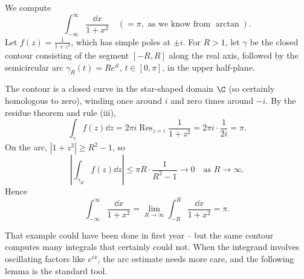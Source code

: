 \begin{example}
    We compute
    $$
    \int_{-\infty}^{\infty} \frac{\dd x}{1 + x^2} \quad (= \pi, \text{ as we know from } \arctan).
    $$
    Let $f(z) = \frac{1}{1 + z^2}$, which has simple poles at $\pm i$. For $R > 1$, let $\gamma$ be the closed contour consisting of the segment $[-R, R]$ along the real axis, followed by the semicircular arc $\gamma_R(t) = Re^{it}$, $t \in [0, \pi]$, in the upper half-plane.

    \begin{center}
    \end{center}

    The contour is a closed curve in the star-shaped domain $\C$ (so certainly homologous to zero), winding once around $i$ and zero times around $-i$. By the residue theorem and rule (iii),
    $$
    \int_\gamma f(z) \dd z = 2 \pi i \operatorname{Res}_{z = i} \frac{1}{1 + z^2} = 2 \pi i \cdot \frac{1}{2i} = \pi.
    $$
    On the arc, $|1 + z^2| \geq R^2 - 1$, so
    $$
    \left|\int_{\gamma_R} f(z) \dd z \right| \leq \pi R \cdot \frac{1}{R^2 - 1} \rightarrow 0 \quad \text{as } R \rightarrow \infty.
    $$
    Hence
    $$
    \int_{-\infty}^{\infty} \frac{\dd x}{1 + x^2} = \lim_{R \to \infty} \int_{-R}^{R} \frac{\dd x}{1 + x^2} = \pi.
    $$
\end{example}

That example could have been done in first year -- but the same contour computes many integrals that certainly could not. When the integrand involves oscillating factors like $e^{ix}$, the arc estimate needs more care, and the following lemma is the standard tool.


